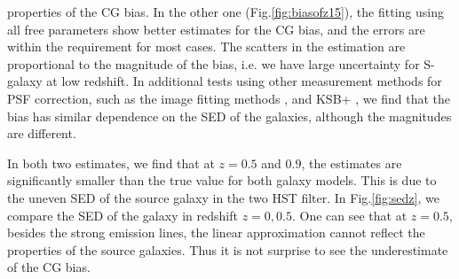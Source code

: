 \documentclass[useAMS,usenatbib]{mn2e}
\begin{document}
properties of the CG bias. In the other one (Fig.\ref{fig:biasofz15}),
the fitting using all free parameters show better estimates for the CG
bias, and the errors are within the requirement for most cases. The
scatters in the estimation are proportional to the magnitude of the
bias, i.e. we have large uncertainty for S-galaxy at low redshift.
In additional tests using other measurement methods for PSF
correction, such as the image fitting methods
\citep[e.g.][]{2007MNRAS.382..315M,2008MNRAS.390..149K,2013MNRAS.429.2858M},
and KSB+ \citep[e.g.][]{1998ApJ...504..636H,2006MNRAS.368.1323H}, we
find that the bias has similar dependence on the SED of the galaxies, 
although the magnitudes are different.

In both two estimates, we find that at $z=0.5$ and $0.9$, the estimates are
significantly smaller than the true value for both galaxy models. This is
due to the uneven SED of the source galaxy in the two HST filter. In
Fig.\ref{fig:sedz}, we compare the SED of the galaxy in redshift
$z=0,0.5$. One can see that at $z=0.5$, besides the strong emission
lines, the linear approximation cannot reflect the properties of the
source galaxies. Thus it is not surprise to see the underestimate of the
CG bias.
\end{document}

